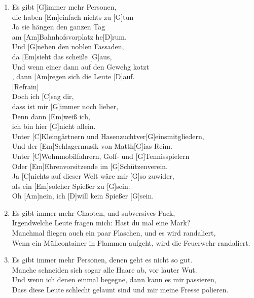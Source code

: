 \def\Titel{Ich will kein Spießer sein}
\def\Interpret{Mono für Alle!}
\def\Referenz{}

\LiedSetup{}

\begin{guitarMagic}
    \begin{enumerate}
        \item Es gibt [G]immer mehr Personen,\\
            die haben [Em]einfach nichts zu [G]tun\\
            Ja sie hängen den ganzen Tag\\
            am [Am]Bahnhofsvorplatz he[D]rum.\\
            Und [G]neben den noblen Fassaden,\\
            da [Em]sieht das scheiße [G]aus,\\
            Und wenn einer dann auf den Gewehg kotzt\\
            , dann [Am]regen sich die Leute [D]auf.\\
            
            [Refrain]\\
            Doch ich [C]sag dir, \\
            dass ist mir [G]immer noch lieber,\\
            Denn dann [Em]weiß ich,\\
            ich bin hier [G]nicht allein.\\
            Unter [C]Kleingärtnern und Hasenzuchtver[G]einsmitgliedern,\\
            Und der [Em]Schlagermusik von Matth[G]ias Reim.\\
            Unter [C]Wohnmobilfahrern, Golf- und [G]Tennisspielern\\
            Oder [Em]Ehrenvorsitzende im [G]Schützenverein.\\
            Ja [C]nichts auf dieser Welt wäre mir [G]so zuwider,\\
            als ein [Em]solcher Spießer zu [G]sein.\\
            Oh [Am]nein, ich [D]will kein Spießer [G]sein.
            
        \item Es gibt immer mehr Chaoten, und subversives Pack,\\
            Irgendwelche Leute fragen mich: Hast du mal eine Mark?\\
            Manchmal fliegen auch ein paar Flaschen, und es wird randaliert,\\
            Wenn ein Müllcontainer in Flammen aufgeht, wird die Feuerwehr randaliert.
            
        \item Es gibt immer mehr Personen, denen geht es nicht so gut.\\
            Manche schneiden sich sogar alle Haare ab, vor lauter Wut.\\
            Und wenn ich denen einmal begegne, dann kann es mir passieren,\\
            Dass diese Leute schlecht gelaunt sind und mir meine Fresse polieren.
    \end{enumerate}
\end{guitarMagic}
